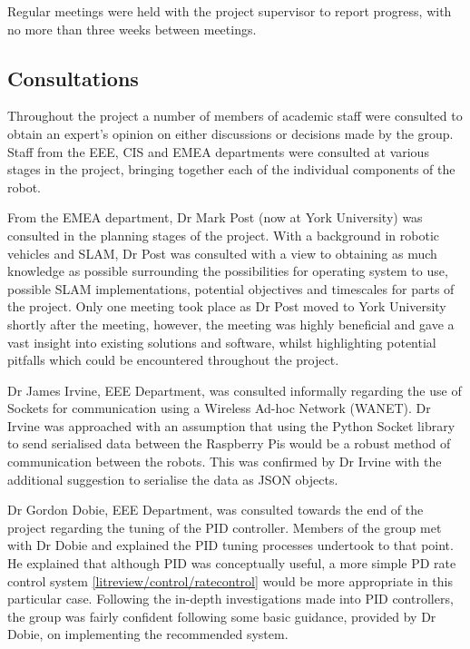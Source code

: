 Regular meetings were held with the project supervisor to report progress, with no 
more than three weeks between meetings.
	

\subsection{Consultations}\label{pm/consultations}
Throughout the project a number of members of academic staff 
were consulted to obtain an expert's opinion on either 
discussions or decisions made by the group. 
Staff from the EEE, CIS and EMEA departments were 
consulted at various stages in the project, bringing together 
each of the individual components of the robot. 

From the EMEA department, Dr Mark Post (now at York University) 
was consulted in the planning stages of the project. With a 
background in robotic vehicles and SLAM, Dr Post was consulted 
with a view to obtaining as much knowledge as possible 
surrounding the possibilities for operating system to use, 
possible SLAM implementations, potential objectives and 
timescales for parts of the project. Only one meeting took place 
as Dr Post moved to York University shortly after the meeting, 
however, the meeting was highly beneficial and gave a vast 
insight into existing solutions and software, whilst highlighting 
potential pitfalls which could be encountered throughout 
the project.

Dr James Irvine, EEE Department, was consulted informally  
regarding the use of Sockets for communication using a Wireless 
Ad-hoc Network (WANET). Dr Irvine was approached with an 
assumption that using the Python Socket library to send 
serialised data between the Raspberry Pis would be a robust 
method of communication between the robots. This was confirmed 
by Dr Irvine with the additional suggestion to serialise the data
as JSON objects. 


Dr Gordon Dobie, EEE Department, was consulted towards the end 
of the project regarding the tuning of the PID controller. 
Members of the group met with Dr Dobie and explained the PID tuning 
processes undertook to that point. He explained that although 
PID was conceptually useful, a more simple PD rate control system 
\ref{litreview/control/ratecontrol} would be more appropriate 
in this particular case. Following the in-depth investigations made 
into PID controllers, the group was fairly confident following some 
basic guidance, provided by Dr Dobie, on implementing the 
recommended system. 

